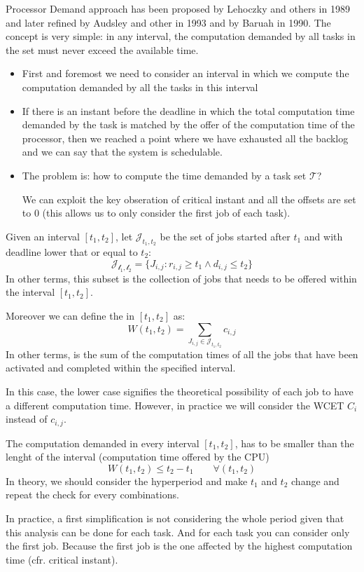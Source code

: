 Processor Demand approach has been proposed by Lehoczky and others in 1989 and later refined by Audsley and other in 1993 and by Baruah in 1990. The concept is very simple: in any interval, the computation demanded by all tasks in the set must never exceed the available time.
\begin{itemize}
\item First and foremost we need to consider an interval in which we compute the computation demanded by all the tasks in this interval\item If there is an instant before the deadline in which the total computation time demanded by the task is matched by the offer of the computation time of the processor, then we reached a point where we have exhausted all the backlog and we can say that the system is schedulable.
\item The problem is: how to compute the time demanded by a task set $\mathcal{T}$?

We can exploit the key obseration of critical instant and all the offsets are set to 0 (this allows us to only consider the first job of each task).
\end{itemize}

Given an interval $[t_1, t_2]$, let $\mathcal{J}_{t_1,t_2}$ be the set of jobs started after $t_1$ and with deadline lower that or equal to $t_2$:
\[\mathcal{J_{t_1, t_2}} = \{J_{i,j}: r_{i,j} \ge t_1 \wedge d_{i,j} \le t_2\}\]
In other terms, this subset is the collection of jobs that needs to be offered within the interval $[t_1, t_2]$.

Moreover we can define the  in $[t_1, t_2]$ as:
\[W(t_1, t_2) = \sum_{J_{i,j}\in\mathcal{J}_{t_1,t_2}}c_{i,j}\]
In other terms, is the sum of the computation times of all the jobs that have been activated and completed within the specified interval.

In this case, the lower case signifies the theoretical possibility of each job to have a different computation time. However, in practice we will consider the WCET $C_i$ instead of $c_{i,j}$.

The computation demanded in every interval $[t_1, t_2]$, has to be smaller than the lenght of the interval (computation time offered by the CPU)
\[W(t_1, t_2) \le t_2-t_1\qquad\forall(t_1,t_2)\]
In theory, we should consider the hyperperiod and make $t_1$ and $t_2$ change and repeat the check for every combinations.

In practice, a first simplification is not considering the whole period given that this analysis can be done for each task.
And for each task you can consider only the first job. Because the first job is the one affected by the highest computation time (cfr. critical instant).

